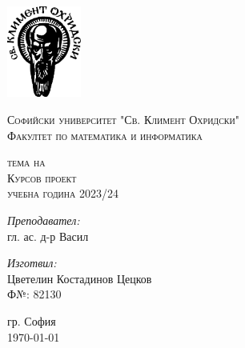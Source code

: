 \newcommand{\univname}{Софийски университет "Св. Климент Охридски"\\Факултет по математика и информатика}

\begin{titlepage}
    \begin{center}
    \vspace*{-2.3cm}
    \includegraphics[height=3cm]{resources/su_logo.png}
        
    \vspace*{.06\textheight}
    {\scshape\large \univname\par}\vspace{2.5cm}
    
    {\huge \bfseries{\thetitle}\par}\vspace{0.7cm}
    \textsc{\small тема на}\\[0.6cm]
    \textsc{\Large Курсов проект}\\[0.5cm]\vspace{0.5cm}
    \textsc{\normalsize учебна година 2023/24}\\[0.6cm]\vspace{2.2cm}
    
        
    \begin{minipage}[t]{0.4\textwidth}
        \begin{flushleft} \large
        \emph{Преподавател:}\\[0.7cm]
        гл. ас. д-р Васил\\[1.6cm]
        
        \end{flushleft}
    \end{minipage}
    \begin{minipage}[t]{0.4\textwidth}
        \begin{flushright} \large
        \emph{Изготвил:}\\[0.7cm]
        Цветелин Костадинов Цецков\\[0.5cm]
        Ф№: 82130\\[0.5cm]
        \end{flushright}
    \end{minipage}

    \vspace{1cm}
    {\large 
    гр. София\\[0.5cm]
    \today
    }
    
    \end{center}
\end{titlepage}